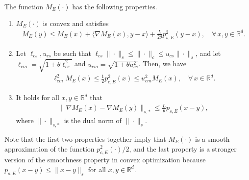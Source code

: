 \documentclass[11 pt]{article}
\begin{document}
	
	\begin{proposition}\label{prop:Moreau}
		The function $M_E(\cdot)$ has the following properties.
		\begin{enumerate}[(1)]
			\item  $M_E(\cdot)$ is convex and satisfies 
			\begin{align*}
				M_E(y)\leq M_E(x)+\langle \nabla M_E(x),y-x\rangle+\frac{L}{2\theta}p_{s,E}^2(y-x),\quad \forall\,x,y\in\mathbb{R}^d.
			\end{align*}
			\item Let  $\ell_{cs},u_{cs}$ be such that $\ell_{cs}\|\cdot\|_s\leq \|\cdot\|_c\leq u_{cs}\|\cdot\|_s$, and let $\ell_{cm}=\sqrt{1+\theta \ell_{cs}^2}$ and $u_{cm}=\sqrt{1+\theta u_{cs}^2}$. Then, we have
			\begin{align*}
				\ell^2_{cm}M_E(x) \leq \frac{1}{2}p^2_{c,E}(x)\leq u^2_{cm}M_E(x),\quad \forall\,x \in \mathbb{R}^d.
			\end{align*}
			\item It holds for all $x,y\in\mathbb{R}^d$ that  
			\begin{align*}
				\| \nabla M_E(x) - \nabla M_E(y) \|_{s,*} \leq \frac{L}{\theta} p_{s,E}(x-y),
			\end{align*}
			where $\| \cdot \|_{s,*}$ is the dual norm of $\| \cdot \|_s$.
		\end{enumerate}
	\end{proposition}
	
	Note that the first two properties together imply that $M_E(\cdot)$ is a smooth approximation of the function $p^2_{c,E}(\cdot)/2$, and the last property is a stronger version of the smoothness property in convex optimization because $p_{s,E}(x-y) \leq \| x-y \|_s$ for all $x, y \in \mathbb{R}^d$. 
	
\end{document}
